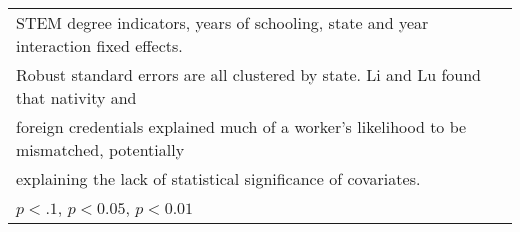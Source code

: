 \begin{table}[htbp]
\begin{tabular}{l*{4}{c}}
\multicolumn{5}{l}{\footnotesize STEM degree indicators, years of schooling, state and year interaction fixed effects.}\\
\multicolumn{5}{l}{\footnotesize Robust standard errors are all clustered by state. Li and Lu found that nativity and}\\
\multicolumn{5}{l}{\footnotesize foreign credentials explained much of a worker's likelihood to be mismatched, potentially}\\
\multicolumn{5}{l}{\footnotesize explaining the lack of statistical significance of covariates.}\\
\multicolumn{5}{l}{\footnotesize \sym{*} \(p<.1\), \sym{**} \(p<0.05\), \sym{***} \(p<0.01\)}\\
\end{tabular}
\end{table}
